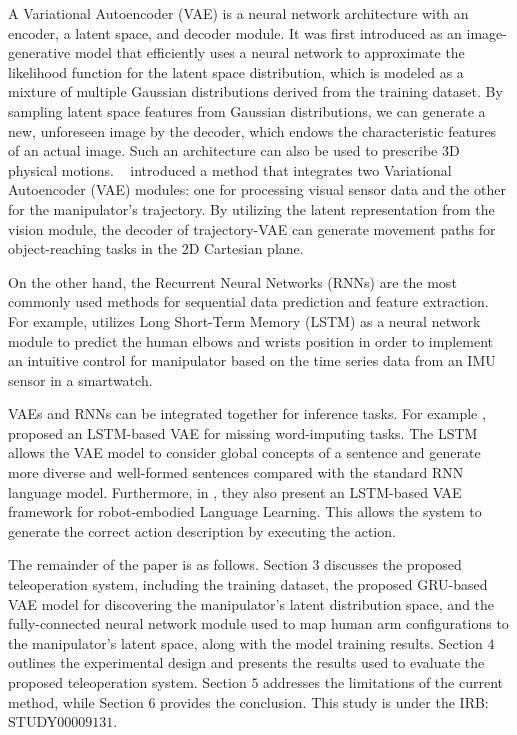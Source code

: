 A Variational Autoencoder (VAE) is a neural network architecture with an encoder, a latent space, and decoder module\cite{kingma_auto-encoding_2022}. It was first introduced as an image-generative model that efficiently uses a neural network to approximate the likelihood function for the latent space distribution, which is modeled as a mixture of multiple Gaussian distributions derived from the training dataset. By sampling latent space features from Gaussian distributions, we can generate a new, unforeseen image by the decoder, which endows the characteristic features of an actual image. Such an architecture can also be used to prescribe $3$D physical motions. ~\cite{hamalainen_affordance_2019} introduced a method that integrates two Variational Autoencoder (VAE) modules: one for processing visual sensor data and the other for the manipulator's trajectory. By utilizing the latent representation from the vision module, the decoder of trajectory-VAE can generate movement paths for object-reaching tasks in the $2$D Cartesian plane.

On the other hand, the Recurrent Neural Networks (RNNs) are the most commonly used methods for sequential data prediction and feature extraction. For example, \cite{weigend_anytime_2023} utilizes Long Short-Term Memory (LSTM) as a neural network module to predict the human elbows and wrists position in order to implement an intuitive control for manipulator based on the time series data from an IMU sensor in a smartwatch.

 VAEs and RNNs can be integrated together for inference tasks. For example \cite{bowman_generating_2016}, proposed an LSTM-based VAE for missing word-imputing tasks. The LSTM allows the VAE model to consider global concepts of a sentence and generate more diverse and well-formed sentences compared with the standard RNN language model. Furthermore, in \cite{ozdemir_embodied_2021}, they also present an LSTM-based VAE framework for robot-embodied Language Learning. This allows the system to generate the correct action description by executing the action. 

The remainder of the paper is as follows. Section $3$ discusses the proposed teleoperation system, including the training dataset, the proposed GRU-based VAE model for discovering the manipulator's latent distribution space, and the fully-connected neural network module used to map human arm configurations to the manipulator's latent space, along with the model training results. Section $4$ outlines the experimental design and presents the results used to evaluate the proposed teleoperation system. Section $5$ addresses the limitations of the current method, while Section $6$ provides the conclusion. This study is under the IRB: STUDY$00009131$.

